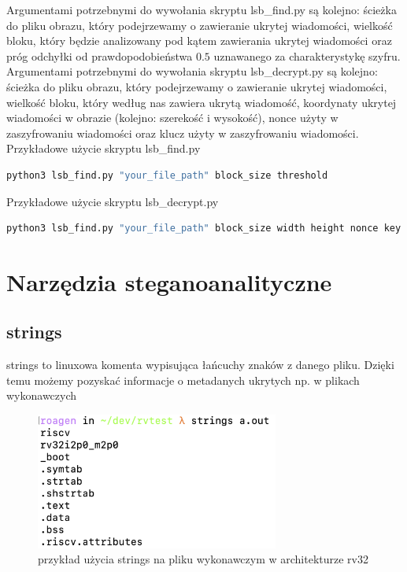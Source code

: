 \documentclass{article}
\begin{document}
Argumentami potrzebnymi do wywołania skryptu lsb\_find.py są kolejno: ścieżka do pliku obrazu, który podejrzewamy o zawieranie ukrytej wiadomości, wielkość bloku, który będzie
 analizowany pod kątem zawierania ukrytej wiadomości oraz próg odchyłki od prawdopodobieństwa $0.5$ uznawanego za charakterystykę szyfru.\\
Argumentami potrzebnymi do wywołania skryptu lsb\_decrypt.py są kolejno: ścieżka do pliku obrazu, który podejrzewamy o zawieranie ukrytej wiadomości, wielkość bloku, który według nas zawiera ukrytą wiadomość, koordynaty ukrytej wiadomości w obrazie (kolejno: szerekość i wysokość), nonce użyty w zaszyfrowaniu wiadomości oraz klucz użyty w zaszyfrowaniu 
wiadomości.\\

Przykładowe użycie skryptu lsb\_find.py
\begin{lstlisting}[language=bash]
python3 lsb_find.py "your_file_path" block_size threshold
\end{lstlisting}

Przykładowe użycie skryptu lsb\_decrypt.py
\begin{lstlisting}[language=bash]
python3 lsb_find.py "your_file_path" block_size width height nonce key
\end{lstlisting}

\section{Narzędzia steganoanalityczne}
\subsection{strings}
strings to linuxowa komenta wypisująca łańcuchy znaków z danego pliku. Dzięki temu możemy pozyskać informacje 
o metadanych ukrytych np. w plikach wykonawczych
\begin{figure}[H]
	\centering
	\includegraphics[width=8cm]{strings_example}
	\caption{przykład użycia strings na pliku wykonawczym w architekturze rv32}
\end{figure}
\end{document}
